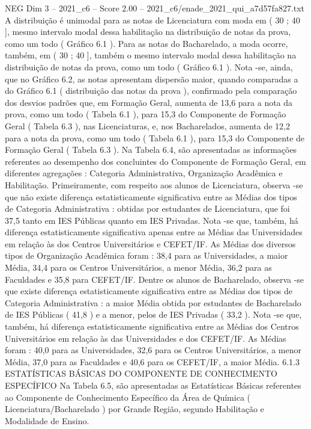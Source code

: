 \begin{textsample}{NEG Dim 3 – 2021\_c6 – Score 2.00 – 2021\_c6/enade\_2021\_qui\_a7d57fa827.txt}
A distribuição é unimodal para as notas de Licenciatura com moda em ( 30 ; 40 ], mesmo intervalo modal dessa habilitação na distribuição de notas da prova, como um todo ( Gráfico 6.1 ).
Para as notas do Bacharelado, a moda ocorre, também, em ( 30 ; 40 ], também o mesmo intervalo modal dessa habilitação na distribuição de notas da prova, como um todo ( Gráfico 6.1 ).
Nota -se, ainda, que no Gráfico 6.2, as notas apresentam dispersão maior, quando comparadas a do Gráfico 6.1 ( distribuição das notas da prova ), confirmado pela comparação dos desvios padrões que, em Formação Geral, aumenta de 13,6 para a nota da prova, como um todo ( Tabela 6.1 ), para 15,3 do Componente de Formação Geral ( Tabela 6.3 ), nas Licenciaturas, e, nos Bacharelados, aumenta de 12,2 para a nota da prova, como um todo ( Tabela 6.1 ), para 15,3 do Componente de Formação Geral ( Tabela 6.3 ).
Na Tabela 6.4, são apresentadas as informações referentes ao desempenho dos concluintes do Componente de Formação Geral, em diferentes agregações : Categoria Administrativa, Organização Acadêmica e Habilitação.
Primeiramente, com respeito aos alunos de Licenciatura, observa -se que não existe diferença estatisticamente significativa entre as Médias dos tipos de Categoria Administrativa : obtidas por estudantes de Licenciatura, que foi 37,5 tanto em IES Públicas quanto em IES Privadas.
Nota -se que, também, há diferença estatisticamente significativa apenas entre as Médias das Universidades em relação às dos Centros Universitários e CEFET/IF.
As Médias dos diversos tipos de Organização Acadêmica foram : 38,4 para as Universidades, a maior Média, 34,4 para os Centros Universitários, a menor Média, 36,2 para as Faculdades e 35,8 para CEFET/IF.
Dentre os alunos de Bacharelado, observa -se que existe diferença estatisticamente significativa entre as Médias dos tipos de Categoria Administrativa : a maior Média obtida por estudantes de Bacharelado de IES Públicas ( 41,8 ) e a menor, pelos de IES Privadas ( 33,2 ).
Nota -se que, também, há diferença estatisticamente significativa entre as Médias dos Centros Universitários em relação às das Universidades e dos CEFET/IF.
As Médias foram : 40,0 para as Universidades, 32,6 para os Centros Universitários, a menor Média, 37,0 para as Faculdades e 40,6 para os CEFET/IF, a maior Média. 6.1.3 ESTATÍSTICAS BÁSICAS DO COMPONENTE DE CONHECIMENTO ESPECÍFICO Na Tabela 6.5, são apresentadas as Estatísticas Básicas referentes ao Componente de Conhecimento Específico da Área de Química ( Licenciatura/Bacharelado ) por Grande Região, segundo Habilitação e Modalidade de Ensino.

\end{textsample}
